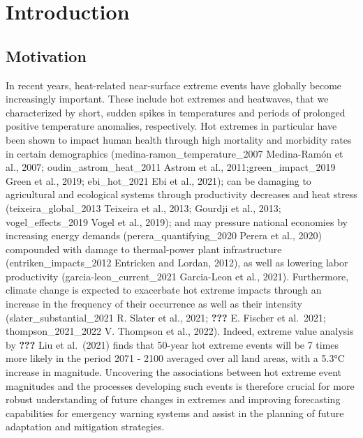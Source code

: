 \documentclass[11pt,a4paper,twoside,openright]{report}
\theoremstyle{definition}
\begin{document}
\chapter{Introduction}\label{introduction}

\section{Motivation}\label{motivation}

In recent years, heat-related near-surface extreme events have globally become increasingly important. These include hot extremes and heatwaves, that we characterized by short, sudden spikes in temperatures and periods of prolonged positive temperature anomalies, respectively. Hot extremes in particular have been shown to impact human health through high mortality and morbidity rates in certain demographics (medina-ramon\_temperature\_2007 Medina-Ramón et al., 2007; oudin\_astrom\_heat\_2011 Astrom et al., 2011;green\_impact\_2019 Green et al., 2019; ebi\_hot\_2021 Ebi et al., 2021); can be damaging to agricultural and ecological systems through productivity decreases and heat stress (teixeira\_global\_2013 Teixeira et al., 2013; Gourdji et al., 2013; vogel\_effects\_2019 Vogel et al., 2019); and may pressure national economies by increasing energy demands (perera\_quantifying\_2020 Perera et al., 2020) compounded with damage to thermal-power plant infrastructure (entriken\_impacts\_2012 Entricken and Lordan, 2012), as well as lowering labor productivity (garcia-leon\_current\_2021 Garcia-Leon et al., 2021). Furthermore, climate change is expected to exacerbate hot extreme impacts through an increase in the frequency of their occurrence as well as their intensity (slater\_substantial\_2021 R. Slater et al., 2021; \textbf{???} E. Fischer et al.~2021; thompson\_2021\_2022 V. Thompson et al., 2022). Indeed, extreme value analysis by \textbf{???} Liu et al.~(2021) finds that 50-year hot extreme events will be 7 times more likely in the period 2071 - 2100 averaged over all land areas, with a 5.3°C increase in magnitude. Uncovering the associations between hot extreme event magnitudes and the processes developing such events is therefore crucial for more robust understanding of future changes in extremes and improving forecasting capabilities for emergency warning systems and assist in the planning of future adaptation and mitigation strategies.
\end{document}
